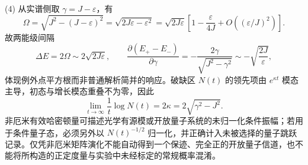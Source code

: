 (4) 从实谱侧取 \(\gamma=J-\varepsilon\)，有
\[
\Omega=\sqrt{J^2-(J-\varepsilon)^2}
=\sqrt{2J\varepsilon-\varepsilon^2}
=\sqrt{2J\varepsilon}\left[1-\frac{\varepsilon}{4J}+O((\varepsilon/J)^2)\right].
\]
故两能级间隔
\[
\boxed{\Delta E=2\Omega\sim2\sqrt{2J\varepsilon}},\qquad
\frac{\partial(E_+-E_-)}{\partial\gamma}
=-\frac{2\gamma}{\sqrt{J^2-\gamma^2}}
\sim-\sqrt{\frac{2J}{\varepsilon}},
\]
体现例外点平方根而非普通解析简并的响应。破缺区 \(N(t)\) 的领先项由
\(e^{\kappa t}\) 模态主导，初态与增长模态重叠不为零，因此
\[
\boxed{\lim_{t\to\infty}\frac1t\log N(t)=2\kappa=2\sqrt{\gamma^2-J^2}}.
\]
非厄米有效哈密顿量可描述光学有源模或开放量子系统的未归一化条件振幅；若用于条件量子态，必须另外以 \(N(t)^{-1/2}\) 归一化，并正确计入未被选择的量子跳跃记录。仅凭非厄米矩阵演化不能自动得到一个保迹、完全正的开放量子信道，也不能将所构造的正定度量与实验中未经标定的常规概率混淆。